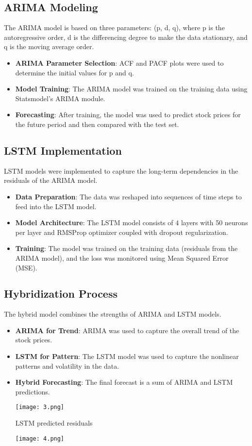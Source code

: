 \documentclass{article} %
\begin{document}
\subsection{ARIMA Modeling}
The ARIMA model is based on three parameters: (p, d, q), where p is the autoregressive order, d is the differencing degree to make the data stationary, and q is the moving average order.

\begin{itemize}
    \item \textbf{ARIMA Parameter Selection}: ACF and PACF plots were used to determine the initial values for p and q.
    \item \textbf{Model Training}: The ARIMA model was trained on the training data using Statsmodel's ARIMA module.
    \item \textbf{Forecasting}: After training, the model was used to predict stock prices for the future period and then compared with the test set.
\end{itemize}

\subsection{LSTM Implementation}
LSTM models were implemented to capture the long-term dependencies in the residuals of the ARIMA model.

\begin{itemize}
    \item \textbf{Data Preparation}: The data was reshaped into sequences of time steps to feed into the LSTM model.
    \item \textbf{Model Architecture}: The LSTM model consists of 4 layers with 50 neurons per layer and RMSProp optimizer coupled with dropout regularization.
    \item \textbf{Training}: The model was trained on the training data (residuals from the ARIMA model), and the loss was monitored using Mean Squared Error (MSE).
   
\end{itemize}

\subsection{Hybridization Process}
The hybrid model combines the strengths of ARIMA and LSTM models.

\begin{itemize}
    \item \textbf{ARIMA for Trend}: ARIMA was used to capture the overall trend of the stock prices.
    \item \textbf{LSTM for Pattern}: The LSTM model was used to capture the nonlinear patterns and volatility in the data.
    \item \textbf{Hybrid Forecasting}: The final forecast is a sum of ARIMA and LSTM predictions.

    
    \texttt{[image: 3.png]}
    \caption{LSTM predicted residuals}
    \texttt{[image: 4.png]}
    \caption{}
    
\end{itemize}
\end{document}
